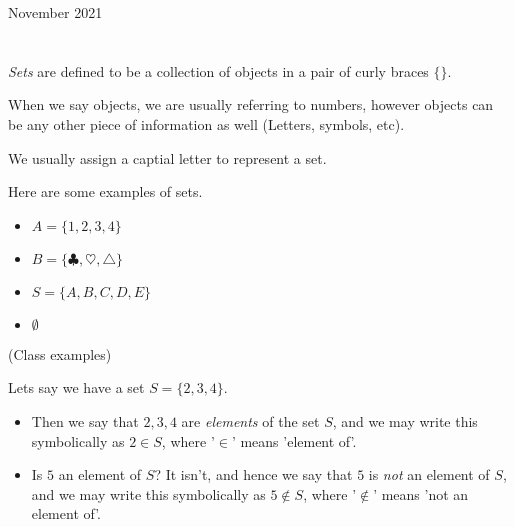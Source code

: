 \documentclass[12pt,oneside]{book} %
\begin{document}
	\renewcommand*{\term}{Term 2} %
	\renewcommand*{\coursecode}{MCR3U} %
	\renewcommand*{\coursename}{Course Name} %
	\renewcommand*{\profname}{Prof Name} %
	\renewcommand*{\colink}{http://www.student.math.uwaterloo.ca/~c2kent} %
	\clearpage
	\pagestyle{classlecture}
\begin{lec}{November 2021}
	\chapter{\chapname\chaplec}
	\begin{mdframed}
		\begin{defn}
		\emph{Sets} are defined to be a collection of objects in a pair of curly braces $\{\}$.
		\end{defn}
	\end{mdframed}
	When we say objects, we are usually referring to numbers, however objects can be any other piece of information as well
		(Letters, symbols, etc).

		We usually assign a captial letter to represent a set.
		\begin{ex} Here are some examples of sets.
			\begin{itemize}
			    \item $A = \{1,2,3,4\}$
			    \item $B = \{\clubsuit, \heartsuit, \triangle\}$
			    \item $S =  \{A,B,C,D,E\}$
			    \item $\emptyset$
	    \end{itemize}
    \end{ex}
		(Class examples)

		\begin{notn} Lets say we have a set $S = \{2,3,4\}$.
			\begin{itemize}
				\item  Then we say that $2,3,4$ are \emph{elements} of the set $S$, and we may write this
			symbolically as $2 \in S$, where '$\in$' means 'element of'.
		\item Is $5$ an element of $S$? It isn't, and hence we say that $5$ is \emph{not} an element of $S$, and we may write this
			symbolically as $5\not\in S$, where '$\not\in$' means 'not an element of'.
		\end{itemize}
			

\end{notn}
\end{lec}
\end{document}

